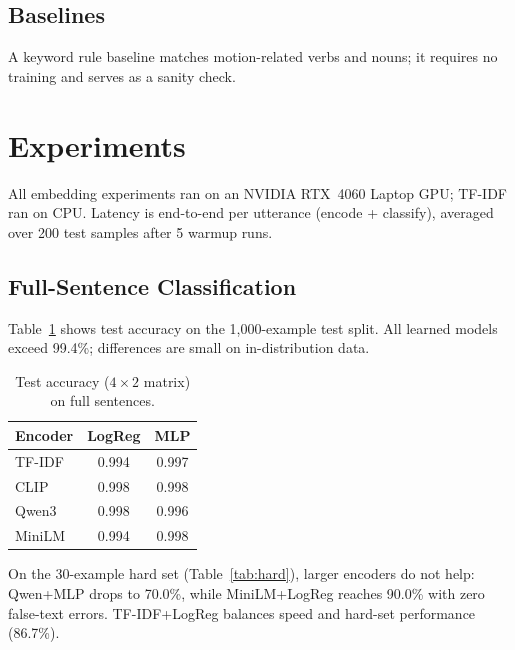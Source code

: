 \documentclass{article}
\begin{document}
\subsection{Baselines}
A keyword rule baseline matches motion-related verbs and nouns; it requires no
training and serves as a sanity check.

\section{Experiments}

All embedding experiments ran on an NVIDIA RTX~4060 Laptop GPU; TF-IDF ran on
CPU.
Latency is end-to-end per utterance (encode + classify), averaged over 200
test samples after 5 warmup runs.

\subsection{Full-Sentence Classification}

Table~\ref{tab:full-acc} shows test accuracy on the 1{,}000-example test split.
All learned models exceed 99.4\%; differences are small on in-distribution
data.

\begin{table}[h]
  \centering
  \caption{Test accuracy ($4 \times 2$ matrix) on full sentences.}
  \label{tab:full-acc}
  \begin{tabular}{lcc}
    \toprule
    Encoder & LogReg & MLP \\
    \midrule
    TF-IDF  & 0.994 & 0.997 \\
    CLIP    & 0.998 & 0.998 \\
    Qwen3   & 0.998 & 0.996 \\
    MiniLM  & 0.994 & 0.998 \\
    \bottomrule
  \end{tabular}
\end{table}

On the 30-example hard set (Table~\ref{tab:hard}), larger encoders do not
help: Qwen+MLP drops to 70.0\%, while MiniLM+LogReg reaches 90.0\% with zero
false-text errors.
TF-IDF+LogReg balances speed and hard-set performance (86.7\%).
\end{document}
